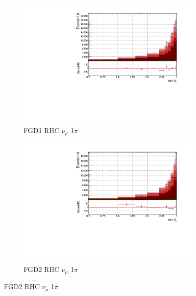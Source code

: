 \begin{figure}[!htbp]
\begin{subfigure}{0.49\textwidth}
  \centering
  \includegraphics[width=\textwidth]{figs/FGD1_NuMuBkg_CC1pi_in_AntiNu_Mode_t}
  \caption{FGD1 RHC $\nu_{\mu}$ 1$\pi$}
\end{subfigure}
\begin{subfigure}{0.49\textwidth}
  \centering
  \includegraphics[width=\textwidth]{figs/FGD2_NuMuBkg_CC1pi_in_AntiNu_Mode_t}
  \caption{FGD2 RHC $\nu_{\mu}$ 1$\pi$}
\end{subfigure}


\end{figure}
